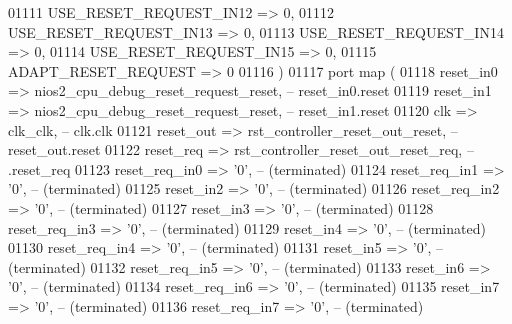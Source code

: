 \begin{DoxyCode}
01111             USE\_RESET\_REQUEST\_IN12    => \textcolor{vhdllogic}{0},
01112             USE\_RESET\_REQUEST\_IN13    => \textcolor{vhdllogic}{0},
01113             USE\_RESET\_REQUEST\_IN14    => \textcolor{vhdllogic}{0},
01114             USE\_RESET\_REQUEST\_IN15    => \textcolor{vhdllogic}{0},
01115             ADAPT\_RESET\_REQUEST       => \textcolor{vhdllogic}{0}
01116         \textcolor{vhdlchar}{)}
01117         \textcolor{keywordflow}{port} \textcolor{keywordflow}{map} (
01118             reset\_in0      => nios2_cpu_debug_reset_request_reset,\textcolor{keyword}{ -- reset\_in0.reset}
01119             reset\_in1      => nios2_cpu_debug_reset_request_reset,\textcolor{keyword}{ -- reset\_in1.reset}
01120             clk            => clk_clk,\textcolor{keyword}{                             --       clk.clk}
01121             reset\_out      => rst_controller_reset_out_reset,\textcolor{keyword}{      -- reset\_out.reset}
01122             reset\_req      => rst_controller_reset_out_reset_req,\textcolor{keyword}{  --          .reset\_req}
01123             reset\_req\_in0  => '0',\textcolor{keyword}{                                 -- (terminated)}
01124             reset\_req\_in1  => '0',\textcolor{keyword}{                                 -- (terminated)}
01125             reset\_in2      => '0',\textcolor{keyword}{                                 -- (terminated)}
01126             reset\_req\_in2  => '0',\textcolor{keyword}{                                 -- (terminated)}
01127             reset\_in3      => '0',\textcolor{keyword}{                                 -- (terminated)}
01128             reset\_req\_in3  => '0',\textcolor{keyword}{                                 -- (terminated)}
01129             reset\_in4      => '0',\textcolor{keyword}{                                 -- (terminated)}
01130             reset\_req\_in4  => '0',\textcolor{keyword}{                                 -- (terminated)}
01131             reset\_in5      => '0',\textcolor{keyword}{                                 -- (terminated)}
01132             reset\_req\_in5  => '0',\textcolor{keyword}{                                 -- (terminated)}
01133             reset\_in6      => '0',\textcolor{keyword}{                                 -- (terminated)}
01134             reset\_req\_in6  => '0',\textcolor{keyword}{                                 -- (terminated)}
01135             reset\_in7      => '0',\textcolor{keyword}{                                 -- (terminated)}
01136             reset\_req\_in7  => '0',\textcolor{keyword}{                                 -- (terminated)}

\end{DoxyCode}
